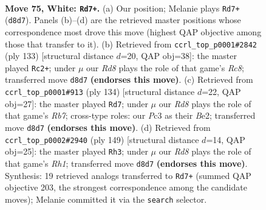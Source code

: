 \documentclass[11pt]{article}
\begin{document}
\clearpage

\begin{figure}[p]\centering
\begin{subfigure}{0.46\textwidth}\centering
\resizebox{\linewidth}{!}{%
\newchessgame
\chessboard[
  setfen={3R4/6k1/8/8/p1p5/PrP4p/7P/6K1 w - - 0 75},
  showmover=false,
  pgfstyle=straightmove, color=movearrow, markmove={d8-d7}
]}
\caption{}
\end{subfigure}\hfill
\begin{subfigure}{0.46\textwidth}\centering
\resizebox{\linewidth}{!}{%
\newchessgame
\chessboard[
  setfen={8/3p1pk1/3R1p2/5P2/6P1/4P3/5K2/2r5 b - - 16 67},
  showmover=false,
  pgfstyle=straightmove, color=movearrow, markmove={c1-c2}
]}
\caption{}
\end{subfigure}
\\[4pt]
\begin{subfigure}{0.46\textwidth}\centering
\resizebox{\linewidth}{!}{%
\newchessgame
\chessboard[
  setfen={5k2/1R6/5p1p/4r2P/3p4/8/3KB3/8 w - - 15 68},
  showmover=false,
  pgfstyle=straightmove, color=movearrow, markmove={b7-d7}
]}
\caption{}
\end{subfigure}\hfill
\begin{subfigure}{0.46\textwidth}\centering
\resizebox{\linewidth}{!}{%
\newchessgame
\chessboard[
  setfen={7r/4k3/8/1pR3p1/pP4P1/P7/2K5/8 b - - 0 75},
  showmover=false,
  pgfstyle=straightmove, color=movearrow, markmove={h8-h3}
]}
\caption{}
\end{subfigure}
\caption{\textbf{Move 75, White: \texttt{Rd7+}.} (a) Our position; Melanie plays \texttt{Rd7+} (\texttt{d8d7}). Panels (b)--(d) are the retrieved master positions whose correspondence most drove this move (highest QAP objective among those that transfer to it). (b) Retrieved from \texttt{ccrl\_top\_p0001\#2842} (ply 133) [structural distance $d$=20, QAP obj=38]: the master played \texttt{Rc2+}; under $\mu$ our \emph{Rd8} plays the role of that game's \emph{Rc8}; transferred move \texttt{d8d7} \textbf{(endorses this move)}. (c) Retrieved from \texttt{ccrl\_top\_p0001\#913} (ply 134) [structural distance $d$=22, QAP obj=27]: the master played \texttt{Rd7}; under $\mu$ our \emph{Rd8} plays the role of that game's \emph{Rb7}; cross-type roles: our \emph{P}c3 as their \emph{B}e2; transferred move \texttt{d8d7} \textbf{(endorses this move)}. (d) Retrieved from \texttt{ccrl\_top\_p0002\#2940} (ply 149) [structural distance $d$=14, QAP obj=25]: the master played \texttt{Rh3}; under $\mu$ our \emph{Rd8} plays the role of that game's \emph{Rh1}; transferred move \texttt{d8d7} \textbf{(endorses this move)}. Synthesis: 19 retrieved analogs transferred to \texttt{Rd7+} (summed QAP objective 203, the strongest correspondence among the candidate moves); Melanie committed it via the \texttt{search} selector.}
\label{fig:thought-m148}
\end{figure}
\end{document}
